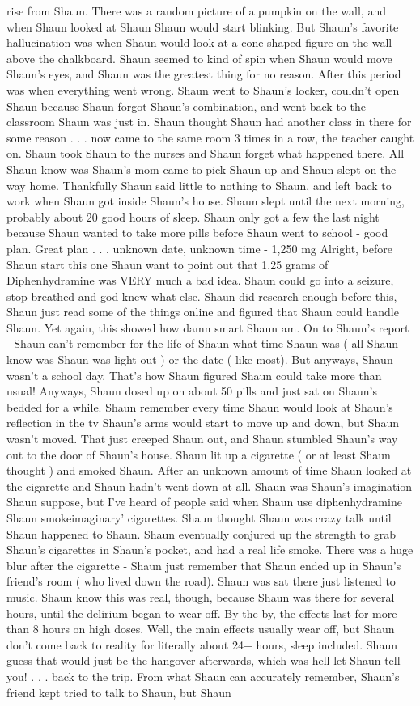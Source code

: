 \documentclass[12pt]{book}
\begin{document}
rise from Shaun. There was a random picture of a pumpkin on the wall, and when Shaun looked at Shaun Shaun would start blinking. But Shaun's favorite hallucination was when Shaun would look at a cone shaped figure on the wall above the chalkboard. Shaun seemed to kind of spin when Shaun would move Shaun's eyes, and Shaun was the greatest thing for no reason. After this period was when everything went wrong. Shaun went to Shaun's locker, couldn't open Shaun because Shaun forgot Shaun's combination, and went back to the classroom Shaun was just in. Shaun thought Shaun had another class in there for some reason . . .  now came to the same room 3 times in a row, the teacher caught on. Shaun took Shaun to the nurses and Shaun forget what happened there. All Shaun know was Shaun's mom came to pick Shaun up and Shaun slept on the way home. Thankfully Shaun said little to nothing to Shaun, and left back to work when Shaun got inside Shaun's house. Shaun slept until the next morning, probably about 20 good hours of sleep. Shaun only got a few the last night because Shaun wanted to take more pills before Shaun went to school - good plan. Great plan . . .  unknown date, unknown time - 1,250 mg Alright, before Shaun start this one Shaun want to point out that 1.25 grams of Diphenhydramine was VERY much a bad idea. Shaun could go into a seizure, stop breathed and god knew what else. Shaun did research enough before this, Shaun just read some of the things online and figured that Shaun could handle Shaun. Yet again, this showed how damn smart Shaun am. On to Shaun's report - Shaun can't remember for the life of Shaun what time Shaun was ( all Shaun know was Shaun was light out ) or the date ( like most). But anyways, Shaun wasn't a school day. That's how Shaun figured Shaun could take more than usual! Anyways, Shaun dosed up on about 50 pills and just sat on Shaun's bedded for a while. Shaun remember every time Shaun would look at Shaun's reflection in the tv Shaun's arms would start to move up and down, but Shaun wasn't moved. That just creeped Shaun out, and Shaun stumbled Shaun's way out to the door of Shaun's house. Shaun lit up a cigarette ( or at least Shaun thought ) and smoked Shaun. After an unknown amount of time Shaun looked at the cigarette and Shaun hadn't went down at all. Shaun was Shaun's imagination Shaun suppose, but I've heard of people said when Shaun use diphenhydramine Shaun smokeimaginary' cigarettes. Shaun thought Shaun was crazy talk until Shaun happened to Shaun. Shaun eventually conjured up the strength to grab Shaun's cigarettes in Shaun's pocket, and had a real life smoke. There was a huge blur after the cigarette - Shaun just remember that Shaun ended up in Shaun's friend's room ( who lived down the road). Shaun was sat there just listened to music. Shaun know this was real, though, because Shaun was there for several hours, until the delirium began to wear off. By the by, the effects last for more than 8 hours on high doses. Well, the main effects usually wear off, but Shaun don't come back to reality for literally about 24+ hours, sleep included. Shaun guess that would just be the hangover afterwards, which was hell let Shaun tell you! . . .  back to the trip. From what Shaun can accurately remember, Shaun's friend kept tried to talk to Shaun, but Shaun 
\end{document}
